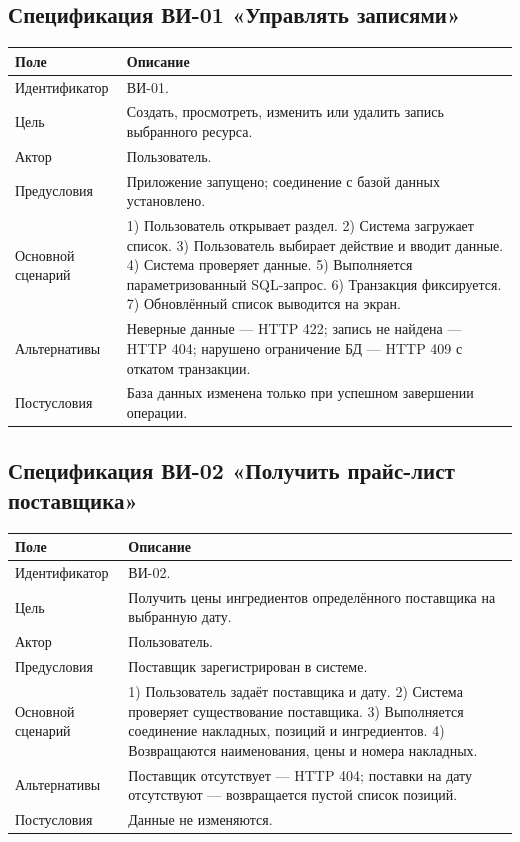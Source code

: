 \documentclass[14pt,a4paper]{extarticle}
\begin{document}
\subsection{Спецификация ВИ-01 «Управлять записями»}

\begin{longtable}{L{0.25\textwidth} L{0.65\textwidth}}
\toprule
\textbf{Поле} & \textbf{Описание} \\
\midrule
\endhead
Идентификатор & ВИ-01. \\
Цель & Создать, просмотреть, изменить или удалить запись выбранного ресурса. \\
Актор & Пользователь. \\
Предусловия & Приложение запущено; соединение с базой данных установлено. \\
Основной сценарий & 1) Пользователь открывает раздел. 2) Система загружает список. 3) Пользователь выбирает действие и вводит данные. 4) Система проверяет данные. 5) Выполняется параметризованный SQL-запрос. 6) Транзакция фиксируется. 7) Обновлённый список выводится на экран. \\
Альтернативы & Неверные данные --- HTTP 422; запись не найдена --- HTTP 404; нарушено ограничение БД --- HTTP 409 с откатом транзакции. \\
Постусловия & База данных изменена только при успешном завершении операции. \\
\bottomrule
\end{longtable}

\subsection{Спецификация ВИ-02 «Получить прайс-лист поставщика»}

\begin{longtable}{L{0.25\textwidth} L{0.65\textwidth}}
\toprule
\textbf{Поле} & \textbf{Описание} \\
\midrule
\endhead
Идентификатор & ВИ-02. \\
Цель & Получить цены ингредиентов определённого поставщика на выбранную дату. \\
Актор & Пользователь. \\
Предусловия & Поставщик зарегистрирован в системе. \\
Основной сценарий & 1) Пользователь задаёт поставщика и дату. 2) Система проверяет существование поставщика. 3) Выполняется соединение накладных, позиций и ингредиентов. 4) Возвращаются наименования, цены и номера накладных. \\
Альтернативы & Поставщик отсутствует --- HTTP 404; поставки на дату отсутствуют --- возвращается пустой список позиций. \\
Постусловия & Данные не изменяются. \\
\bottomrule
\end{longtable}
\end{document}
